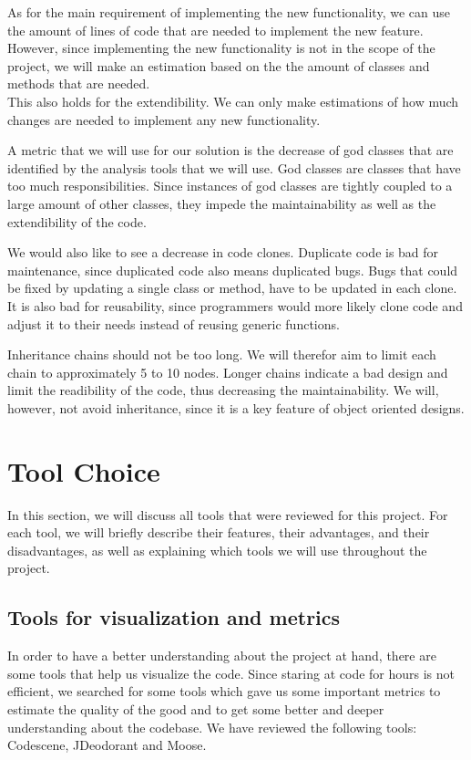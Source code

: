 \documentclass[]{article}
\begin{document}
As for the main requirement of implementing the new functionality, we can use the amount of lines of code that are needed to implement the new feature. However, since implementing the new functionality is not in the scope of the project, we will make an estimation based on the the amount of classes and methods that are needed. \\
This also holds for the extendibility. We can only make estimations of how much changes are needed to implement any new functionality. 

A metric that we will use for our solution is the decrease of god classes that are identified by the analysis tools that we will use. God classes are classes that have too much responsibilities. Since instances of god classes are tightly coupled to a large amount of other classes, they impede the maintainability as well as the extendibility of the code.

We would also like to see a decrease in code clones. Duplicate code is bad for maintenance, since duplicated code also means duplicated bugs. Bugs that could be fixed by updating a single class or method, have to be updated in each clone. It is also bad for reusability, since programmers would more likely clone code and adjust it to their needs instead of reusing generic functions. 


Inheritance chains should not be too long. We will therefor aim to limit each chain to approximately 5 to 10 nodes. Longer chains indicate a bad design and limit the readibility of the code, thus decreasing the maintainability. We will, however, not avoid inheritance, since it is a key feature of object oriented designs. 



\section{Tool Choice}

In this section, we will discuss all tools that were reviewed for this project. For each tool, we will briefly describe their features, their advantages, and their disadvantages, as well as explaining which tools we will use throughout the project. 

\subsection{Tools for visualization and metrics}
In order to have a better understanding about the project at hand, there are some tools that help us visualize the code. Since staring at code for hours is not efficient, we searched for some tools which gave us some important metrics to estimate the quality of the good and to get some better and deeper understanding about the codebase. We have reviewed the following tools: Codescene, JDeodorant and Moose.
\end{document}
